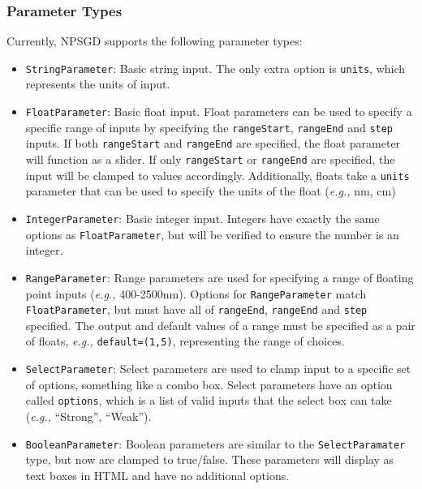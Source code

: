 \documentclass{article}
\newcommand{\mclass}[1]{\sloppy\texttt{#1}}
\begin{document}
\subsubsection{Parameter Types}
\label{sec:ParameterTypes}
Currently, NPSGD supports the following parameter types:
\begin{itemize}
    \item \mclass{StringParameter}: Basic string input. The only extra option is
              \mclass{units}, which represents the units of input.

    \item \mclass{FloatParameter}: Basic float input. Float parameters can be
              used to specify a specific range of inputs by specifying the
              \mclass{rangeStart}, \mclass{rangeEnd} and \mclass{step} inputs. If both
              \mclass{rangeStart} and \mclass{rangeEnd} are specified, the float
              parameter will function as a slider. If only \mclass{rangeStart} or
              \mclass{rangeEnd} are specified, the input will be clamped to values
              accordingly. Additionally, floats take a \mclass{units} parameter that
              can be used to specify the units of the float (\textit{e.g.,} nm, cm)

    \item \mclass{IntegerParameter}: Basic integer input. Integers have exactly
              the same options as \mclass{FloatParameter}, but will be verified to
              ensure the number is an integer.

    \item \mclass{RangeParameter}: Range parameters are used for specifying a
              range of floating point inputs (\textit{e.g.,} 400-2500nm). Options for
              \mclass{RangeParameter} match \mclass{FloatParameter}, but must
              have all of \mclass{rangeEnd}, \mclass{rangeEnd} and \mclass{step}
              specified. The output and default values of a range must be
              specified as a pair of floats, \textit{e.g.,} \mclass{default=(1,5)},
              representing the range of choices.

    \item \mclass{SelectParameter}: Select parameters are used to clamp input to
              a specific set of options, something like a combo box. Select
              parameters have an option called \mclass{options}, which is a list
              of valid inputs that the select box can take (\textit{e.g.,} ``Strong'',
              ``Weak'').

    \item \mclass{BooleanParameter}: Boolean parameters are similar to the
              \mclass{SelectParamater} type, but now are clamped to true/false. 
              These parameters will display as text boxes in HTML and have no
              additional options.
\end{itemize}
\end{document}
